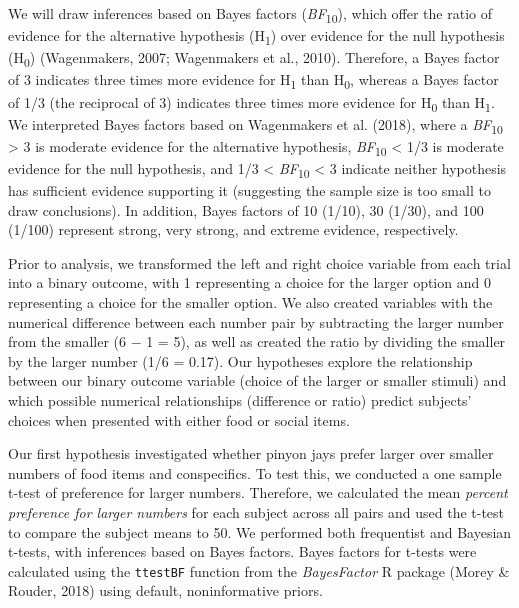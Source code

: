 \documentclass[
  ,pub,floatsintext]{apa6}
\begin{document}
We will draw inferences based on Bayes factors (\emph{BF}\textsubscript{10}), which offer the ratio of evidence for the alternative hypothesis (H\textsubscript{1}) over evidence for the null hypothesis (H\textsubscript{0}) (Wagenmakers, 2007; Wagenmakers et al., 2010). Therefore, a Bayes factor of 3 indicates three times more evidence for H\textsubscript{1} than H\textsubscript{0}, whereas a Bayes factor of 1/3 (the reciprocal of 3) indicates three times more evidence for H\textsubscript{0} than H\textsubscript{1}. We interpreted Bayes factors based on Wagenmakers et al. (2018), where a \emph{BF}\textsubscript{10} \textgreater{} 3 is moderate evidence for the alternative hypothesis, \emph{BF}\textsubscript{10} \textless{} 1/3 is moderate evidence for the null hypothesis, and 1/3 \textless{} \emph{BF}\textsubscript{10} \textless{} 3 indicate neither hypothesis has sufficient evidence supporting it (suggesting the sample size is too small to draw conclusions). In addition, Bayes factors of 10 (1/10), 30 (1/30), and 100 (1/100) represent strong, very strong, and extreme evidence, respectively.

Prior to analysis, we transformed the left and right choice variable from each trial into a binary outcome, with 1 representing a choice for the larger option and 0 representing a choice for the smaller option. We also created variables with the numerical difference between each number pair by subtracting the larger number from the smaller (6 \(-\) 1 = 5), as well as created the ratio by dividing the smaller by the larger number (1/6 = 0.17). Our hypotheses explore the relationship between our binary outcome variable (choice of the larger or smaller stimuli) and which possible numerical relationships (difference or ratio) predict subjects' choices when presented with either food or social items.

Our first hypothesis investigated whether pinyon jays prefer larger over smaller numbers of food items and conspecifics. To test this, we conducted a one sample t-test of preference for larger numbers. Therefore, we calculated the mean \emph{percent preference for larger numbers} for each subject across all pairs and used the t-test to compare the subject means to 50. We performed both frequentist and Bayesian t-tests, with inferences based on Bayes factors. Bayes factors for t-tests were calculated using the \texttt{ttestBF} function from the \emph{BayesFactor} R package (Morey \& Rouder, 2018) using default, noninformative priors.
\end{document}
